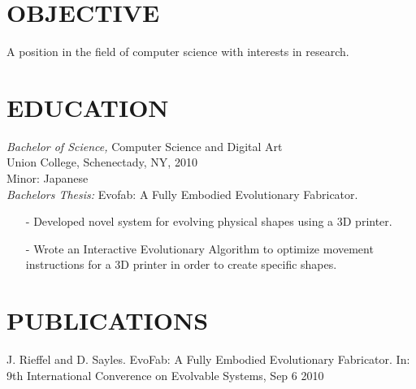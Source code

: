 \documentclass[margin, 10pt]{res} %
\begin{document}
\begin{resume}

 
\section{OBJECTIVE}  

A position in the field of computer science with interests in research.


\section{EDUCATION}

{\sl Bachelor of Science,} Computer Science and Digital Art \\
Union College, Schenectady, NY, 2010 \\
Minor: Japanese \\
{\sl Bachelors Thesis:} Evofab: A Fully Embodied Evolutionary Fabricator.
\begin{itemize}
\item[-] Developed novel system for evolving physical shapes using a 3D printer.
\item[-] Wrote an Interactive Evolutionary Algorithm to optimize movement instructions for a 3D printer in order to create specific shapes.
\end{itemize}

 
\section{PUBLICATIONS}
J. Rieffel and D. Sayles. EvoFab: A Fully Embodied Evolutionary Fabricator.  In: 9th International Converence on Evolvable Systems, Sep 6 2010 \\
 


\end{resume}
\end{document}
